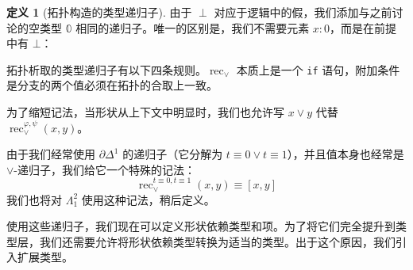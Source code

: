 \documentclass{ctexrep}
\theoremstyle{plain}
\theoremstyle{definition}
\newtheorem{definition}[theorem]{定义}
\theoremstyle{remark}
\theoremstyle{definition}
\theoremstyle{definition}
\theoremstyle{definition}
\newcommand{\rec}{\operatorname{rec}}
\begin{document}
\begin{definition}[拓扑构造的类型递归子]
由于 $\perp$ 对应于逻辑中的假，我们添加与之前讨论的空类型 $\mathbb{0}$ 相同的递归子。唯一的区别是，我们不需要元素 $x:0$，而是在前提中有 $\bot$：
拓扑析取的类型递归子有以下四条规则。$\rec_{\lor}$ 本质上是一个 \verb|if| 语句，附加条件是分支的两个值必须在拓扑的合取上一致。
为了缩短记法，当形状从上下文中明显时，我们也允许写 $x\lor y$ 代替 $\rec_{\lor}^{\varphi,\psi}(x,y)$。

由于我们经常使用 $\partial\Delta^1$ 的递归子（它分解为 $t\equiv 0\lor t\equiv 1$），并且值本身也经常是 $\lor$-递归子，我们给它一个特殊的记法：
\[
\rec_{\lor}^{t\equiv0,t\equiv1}(x,y) \equiv [x,y]
\]
我们也将对 $\Lambda_1^2$ 使用这种记法，稍后定义。
\end{definition}

使用这些递归子，我们现在可以定义形状依赖类型和项。为了将它们完全提升到类型层，我们还需要允许将形状依赖类型转换为适当的类型。出于这个原因，我们引入扩展类型。
\end{document}
